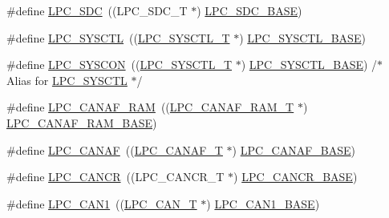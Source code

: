 \begin{DoxyCompactItemize}
\item 
\#define \hyperlink{group__PERIPH__177X__8X__BASE_ga3914f06f63d5e9e9156865b86956bca8}{L\-P\-C\-\_\-\-S\-D\-C}~((L\-P\-C\-\_\-\-S\-D\-C\-\_\-\-T              $\ast$) \hyperlink{group__PERIPH__407X__8X__BASE_gab8f044e5911a6bf51879e4614bf2a0a3}{L\-P\-C\-\_\-\-S\-D\-C\-\_\-\-B\-A\-S\-E})
\item 
\#define \hyperlink{group__PERIPH__177X__8X__BASE_ga30cc92eba86b30295b3dcf3da503b736}{L\-P\-C\-\_\-\-S\-Y\-S\-C\-T\-L}~((\hyperlink{structLPC__SYSCTL__T}{L\-P\-C\-\_\-\-S\-Y\-S\-C\-T\-L\-\_\-\-T}           $\ast$) \hyperlink{group__PERIPH__407X__8X__BASE_gae4670b50fe27772fa31de1da10bec7b7}{L\-P\-C\-\_\-\-S\-Y\-S\-C\-T\-L\-\_\-\-B\-A\-S\-E})
\item 
\#define \hyperlink{group__PERIPH__177X__8X__BASE_gabe45c10a979fe812e3d9ecd72fe33a2f}{L\-P\-C\-\_\-\-S\-Y\-S\-C\-O\-N}~((\hyperlink{structLPC__SYSCTL__T}{L\-P\-C\-\_\-\-S\-Y\-S\-C\-T\-L\-\_\-\-T}           $\ast$) \hyperlink{group__PERIPH__407X__8X__BASE_gae4670b50fe27772fa31de1da10bec7b7}{L\-P\-C\-\_\-\-S\-Y\-S\-C\-T\-L\-\_\-\-B\-A\-S\-E}) /$\ast$ Alias for \hyperlink{group__PERIPH__407X__8X__BASE_ga30cc92eba86b30295b3dcf3da503b736}{L\-P\-C\-\_\-\-S\-Y\-S\-C\-T\-L} $\ast$/
\item 
\#define \hyperlink{group__PERIPH__177X__8X__BASE_gaf02b7bcdc41a045910b3f0bae8a8f4b0}{L\-P\-C\-\_\-\-C\-A\-N\-A\-F\-\_\-\-R\-A\-M}~((\hyperlink{structLPC__CANAF__RAM__T}{L\-P\-C\-\_\-\-C\-A\-N\-A\-F\-\_\-\-R\-A\-M\-\_\-\-T}        $\ast$) \hyperlink{group__PERIPH__407X__8X__BASE_ga9d4f2bac61e26b32ad64d62f2be50e49}{L\-P\-C\-\_\-\-C\-A\-N\-A\-F\-\_\-\-R\-A\-M\-\_\-\-B\-A\-S\-E})
\item 
\#define \hyperlink{group__PERIPH__177X__8X__BASE_ga4f738c971938302f38d54e662c9f7774}{L\-P\-C\-\_\-\-C\-A\-N\-A\-F}~((\hyperlink{structLPC__CANAF__T}{L\-P\-C\-\_\-\-C\-A\-N\-A\-F\-\_\-\-T}            $\ast$) \hyperlink{group__PERIPH__407X__8X__BASE_gabc6943f9e943d63ecf4e236b4ce7c344}{L\-P\-C\-\_\-\-C\-A\-N\-A\-F\-\_\-\-B\-A\-S\-E})
\item 
\#define \hyperlink{group__PERIPH__177X__8X__BASE_gadc209557a5736e29149b96018056fc29}{L\-P\-C\-\_\-\-C\-A\-N\-C\-R}~((L\-P\-C\-\_\-\-C\-A\-N\-C\-R\-\_\-\-T            $\ast$) \hyperlink{group__PERIPH__407X__8X__BASE_gac22b88e108d620661add143c174f8f11}{L\-P\-C\-\_\-\-C\-A\-N\-C\-R\-\_\-\-B\-A\-S\-E})
\item 
\#define \hyperlink{group__PERIPH__177X__8X__BASE_ga2f006d6888921f8336dce504eb56f4aa}{L\-P\-C\-\_\-\-C\-A\-N1}~((\hyperlink{structLPC__CAN__T}{L\-P\-C\-\_\-\-C\-A\-N\-\_\-\-T}              $\ast$) \hyperlink{group__PERIPH__407X__8X__BASE_gaf2407c1927ebddd767832aefa74c3398}{L\-P\-C\-\_\-\-C\-A\-N1\-\_\-\-B\-A\-S\-E})

\end{DoxyCompactItemize}
